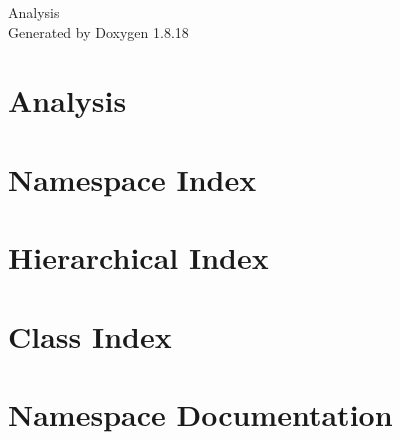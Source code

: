 \let\mypdfximage\pdfximage\def\pdfximage{\immediate\mypdfximage}\documentclass[twoside]{book}
\newcommand{\+}{\discretionary{\mbox{\scriptsize$\hookleftarrow$}}{}{}}
\newcommand{\clearemptydoublepage}{%
  \newpage{\pagestyle{empty}\cleardoublepage}%
}
\begin{document}
\hypersetup{pageanchor=false,
             bookmarksnumbered=true,
             pdfencoding=unicode
            }
\begin{titlepage}
\vspace*{7cm}
\begin{center}%
{\Large Analysis }\\
\vspace*{1cm}
{\large Generated by Doxygen 1.8.18}\\
\end{center}
\end{titlepage}
\clearemptydoublepage
{}
\tableofcontents
\clearemptydoublepage
{}
\hypersetup{pageanchor=true}

\chapter{Analysis}
\label{index}\hypertarget{index}{}
\chapter{Namespace Index}

\chapter{Hierarchical Index}

\chapter{Class Index}

\chapter{Namespace Documentation}




















\end{document}
